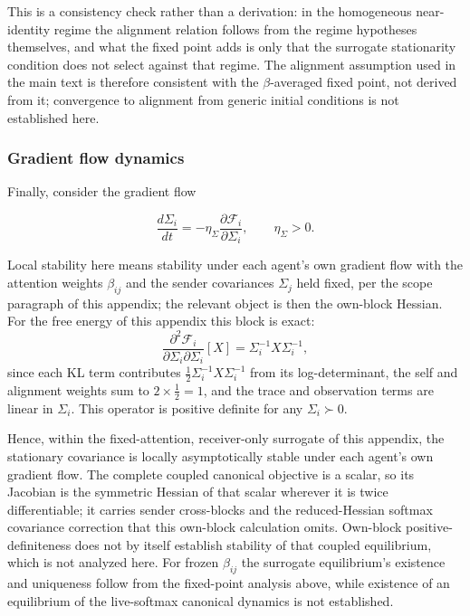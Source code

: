 \documentclass[11pt]{article}
\begin{document}
This is a consistency check rather than a derivation: in the homogeneous near-identity regime the alignment relation follows from the regime hypotheses themselves, and what the fixed point adds is only that the surrogate stationarity condition does not select against that regime. The alignment assumption used in the main text is therefore consistent with the $\beta$-averaged fixed point, not derived from it; convergence to alignment from generic initial conditions is not established here.

\subsubsection{Gradient flow dynamics}

Finally, consider the gradient flow

\begin{equation}
\frac{d\Sigma_i}{dt}
=-\eta_\Sigma
\frac{\partial \mathcal{F}_i}{\partial \Sigma_i},
\qquad\eta_\Sigma > 0.
\end{equation}

Local stability here means stability under each agent's own gradient flow with the attention weights $\beta_{ij}$ and the sender covariances $\Sigma_j$ held fixed, per the scope paragraph of this appendix; the relevant object is then the own-block Hessian. For the free energy of this appendix this block is exact:
\begin{equation}
\frac{\partial^2 \mathcal{F}_i}{\partial \Sigma_i \partial \Sigma_i}[X]
= \Sigma_i^{-1} X \Sigma_i^{-1},
\end{equation}
since each KL term contributes $\tfrac{1}{2}\Sigma_i^{-1}X\Sigma_i^{-1}$ from its log-determinant, the self and alignment weights sum to $2 \times \tfrac{1}{2} = 1$, and the trace and observation terms are linear in $\Sigma_i$. This operator is positive definite for any $\Sigma_i \succ 0$.

Hence, within the fixed-attention, receiver-only surrogate of this appendix, the stationary covariance is locally asymptotically stable under each agent's own gradient flow. The complete coupled canonical objective is a scalar, so its Jacobian is the symmetric Hessian of that scalar wherever it is twice differentiable; it carries sender cross-blocks and the reduced-Hessian softmax covariance correction that this own-block calculation omits. Own-block positive-definiteness does not by itself establish stability of that coupled equilibrium, which is not analyzed here. For frozen $\beta_{ij}$ the surrogate equilibrium's existence and uniqueness follow from the fixed-point analysis above, while existence of an equilibrium of the live-softmax canonical dynamics is not established.
\end{document}
